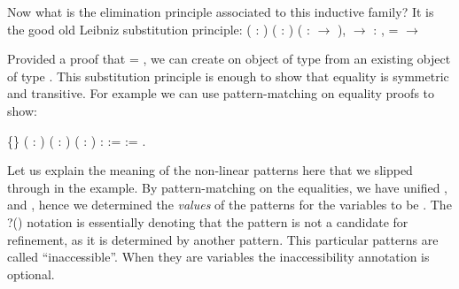    Now what is the elimination principle associated to this inductive family?
   It is the good old Leibniz substitution principle: \coqdoceol
\coqdocemptyline
\coqdocnoindent
\coqdockw{\ensuremath{\forall}} ( : ) ( : ) ( :  \ensuremath{\rightarrow} ),   \ensuremath{\rightarrow} \coqdockw{\ensuremath{\forall}}  : ,  =  \ensuremath{\rightarrow}   

\coqdocemptyline


   Provided a proof that  = , we can create on object of type   from an 
   existing object of type  . This substitution principle is enough to show
   that equality is symmetric and transitive. For example we can use 
   pattern-matching on equality proofs to show:
 \begin{coqdoccode}
\coqdocemptyline
\coqdocnoindent
{}  \{\} (   : ) ( :   ) ( :   ) :    :=\coqdoceol
\coqdocnoindent
{}  \coqdocnotation{)} \coqdocnotation{)}   := .\coqdoceol
\coqdocemptyline
\end{coqdoccode}
Let us explain the meaning of the non-linear patterns here that we
   slipped through in the  example. By pattern-matching on the
   equalities, we have unified ,  and , hence we determined the
   \textit{values} of the patterns for the variables to be . The ?()
   notation is essentially denoting that the pattern is not a candidate
   for refinement, as it is determined by another pattern. This
   particular patterns are called ``inaccessible''. When they are variables
   the inaccessibility annotation is optional.


